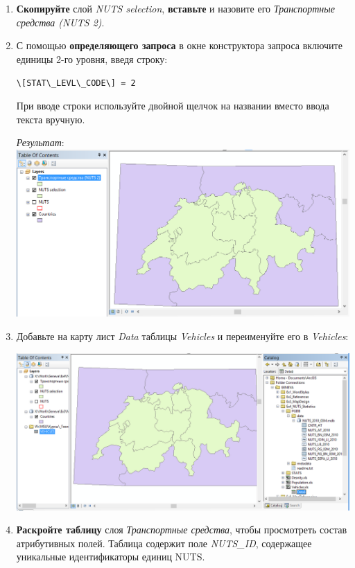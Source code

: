 \documentclass[]{book}
\theoremstyle{definition}
\theoremstyle{definition}
\theoremstyle{definition}
\theoremstyle{remark}
\begin{document}
\begin{enumerate}
\def\labelenumi{\arabic{enumi}.}
\item
  \textbf{Скопируйте} слой \emph{NUTS selection}, \textbf{вставьте} и
  назовите его \emph{Транспортные средства (NUTS 2)}.
\item
  С помощью \textbf{определяющего запроса} в окне конструктора запроса
  включите единицы 2-го уровня, введя строку:

  \texttt{\textbackslash{}{[}STAT\textbackslash{}\_LEVL\textbackslash{}\_CODE\textbackslash{}{]}\ =\ 2}

  При вводе строки используйте двойной щелчок на названии вместо ввода
  текста вручную.

  \emph{Результат}: \includegraphics{images/Ex08/image20.png}
\item
  Добавьте на карту лист \emph{Data} таблицы \emph{Vehicles} и
  переименуйте его в \emph{Vehicles}:

  \includegraphics{images/Ex08/image21.png}
\item
  \textbf{Раскройте таблицу} слоя \emph{Транспортные средства}, чтобы
  просмотреть состав атрибутивных полей. Таблица содержит поле
  \emph{NUTS\_ID}, содержащее уникальные идентификаторы единиц NUTS.


\end{enumerate}
\end{document}

